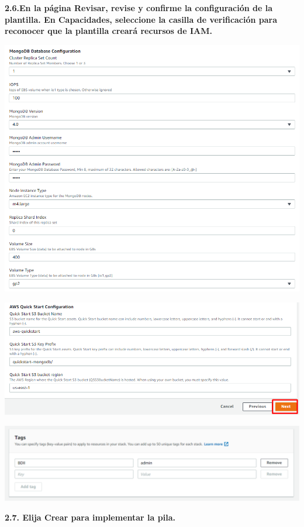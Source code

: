 \documentclass{article}
\begin{document}
	\newpage
\textbf{2.6.En la página Revisar, revise y confirme la configuración de la plantilla. En Capacidades, seleccione la casilla de verificación para reconocer que la plantilla creará recursos de IAM. }

\begin{center}
		\includegraphics[width=15cm]{./images/13} 
	\end{center}
	\begin{center}
		\includegraphics[width=15cm]{./images/14} 
	\end{center}
	
    \begin{center}
		\includegraphics[width=15cm]{./images/15} 
	\end{center}
\textbf{2.7. Elija Crear para implementar la pila.
}
\end{document}
